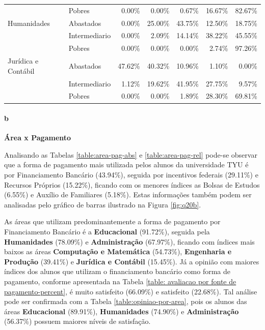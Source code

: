 \documentclass[10pt,a4paper,oneside]{article}
\begin{document}
\begin{table}[ht]
\begin{tabular}{ll rrrrr}
                          & Pobres                  &               0.00\% &         0.00\% &        0.67\% &      16.67\% &            82.67\% \\ 
  Humanidades             & Abastados               &               0.00\% &        25.00\% &       43.75\% &      12.50\% &            18.75\% \\ 
                          & Intermediario           &               0.00\% &         2.09\% &       14.14\% &      38.22\% &            45.55\% \\ 
                          & Pobres                  &               0.00\% &         0.00\% &        0.00\% &       2.74\% &            97.26\% \\ 
  Jurídica e Contábil     & Abastados               &              47.62\% &        40.32\% &       10.96\% &       1.10\% &             0.00\% \\ 
                          & Intermediario           &               1.12\% &        19.62\% &       41.95\% &      27.75\% &             9.57\% \\ 
                          & Pobres                  &               0.00\% &         0.00\% &        1.89\% &      28.30\% &            69.81\% \\ 
   \bottomrule
\end{tabular}
\end{table}



\paragraph{b}{\textbf{Área x Pagamento}}

Analisando as Tabelas \ref{table:area-pag-abs} e \ref{table:area-pag-rel} pode-se observar que a forma de pagamento mais utilizada pelos alunos da universidade TYU é por Financiamento Bancário 
(43.94\%), seguida por incentivos federais (29.11\%) e Recursos Próprios (15.22\%), ficando com os menores índices as Bolsas de Estudos (6.55\%) e Auxílio de Familiares (5.18\%). Estas informações 
também podem ser analisadas pelo gráfico de barras ilustrado na Figura \ref{fig:q20b}.

As áreas que utilizam predominantemente a forma de pagamento por Financiamento Bancário é a \textbf{Educacional} (91.72\%), seguida pela \textbf{Humanidades} (78.09\%) e \textbf{Administração} 
(67.97\%), ficando com índices mais baixos as áreas \textbf{Computação e Matemática} (54.73\%), \textbf{Engenharia e Produção} (39.41\%) e \textbf{Jurídica e Contábil} (15.45\%). Já a opinião com 
maiores índices dos alunos que utilizam o financiamento bancário como forma de pagamento, conforme apresentada na Tabela \ref{table: avaliacao por fonte de pagamento-percent}, é muito satisfeito (66.09\%) e satisfeito (22.68\%). Tal análise pode ser confirmada com a Tabela 
\ref{table:opiniao-por-area}, pois os alunos das áreas \textbf{Educacional} (89.91\%), \textbf{Humanidades} (74.90\%) e \textbf{Administração} (56.37\%) possuem maiores níveis de satisfação.
\end{document}
